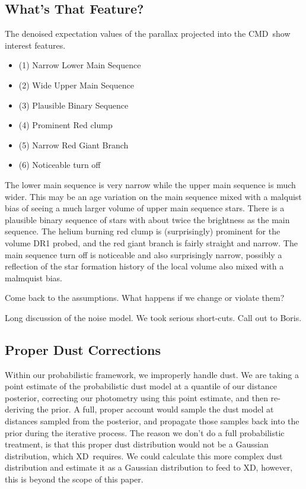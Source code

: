 \documentclass[modern]{aastex61}
\newcommand{\acronym}[1]{{\small{#1}}}
\newcommand{\xd}{\acronym{XD}}
\newcommand{\cmd}{\acronym{CMD}}
\begin{document}
\subsection{What's That Feature?}
The denoised expectation values of the parallax projected into the \cmd\ show interest features.
\begin{itemize}
\item (1) Narrow Lower Main Sequence
\item (2) Wide Upper Main Sequence
\item (3) Plausible Binary Sequence
\item (4) Prominent Red clump
\item (5) Narrow Red Giant Branch
\item (6) Noticeable turn off
\end{itemize}
The lower main sequence is very narrow while the upper main sequence is much wider. This may be an age variation on the main sequence mixed with a malquist bias of seeing a much larger volume of upper main sequence stars. There is a plausible binary sequence of stars with about twice the brightness as the main sequence. The helium burning red clump is (surprisingly) prominent for the volume DR1 probed, and the red giant branch is fairly straight and narrow. The main sequence turn off is noticeable and also surprisingly narrow, possibly a reflection of the star formation history of the local volume also mixed with a malmquist bias.

Come back to the assumptions. What happens if we change or violate them?

Long discussion of the noise model. We took serious short-cuts. Call out to Boris.

\subsection{Proper Dust Corrections}
Within our probabilistic framework, we improperly handle dust. We are taking a point estimate of the probabilistic dust model at a quantile of our distance posterior, correcting our photometry using this point estimate, and then re-deriving the prior. A full, proper account would sample the dust model at distances sampled from the posterior, and propagate those samples back into the prior during the iterative process. The reason we don't do a full probabilistic treatment, is that this proper dust distribution would not be a Gaussian distribution, which \xd\ requires. We could calculate this more complex dust distribution and estimate it as a Gaussian distribution to feed to \xd, however, this is beyond the scope of this paper.
\end{document}
